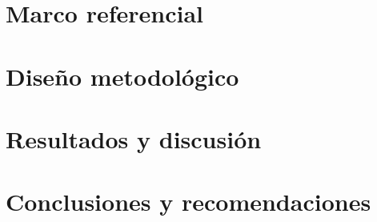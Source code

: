 \documentclass[12pt,a4paper,oneside]{report}
\begin{document}
\chapter{Marco referencial}


\chapter{Diseño metodológico}


\chapter{Resultados y discusión}


\chapter{Conclusiones y recomendaciones}

\end{document}
